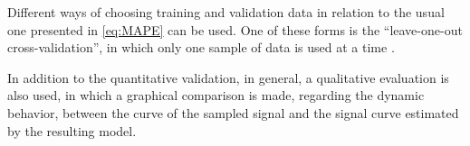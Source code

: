 Different ways of choosing training and validation data in relation to the usual one presented in \eqref{eq:MAPE} can be used.
One of these forms is the “leave-one-out cross-validation”, in which only one sample of data is used at a time \citep{allen1974}.

In addition to the quantitative validation, in general, a qualitative evaluation is also used, in which a graphical comparison is made, regarding the dynamic behavior, between the curve of the sampled signal and the signal curve estimated by the resulting model.






